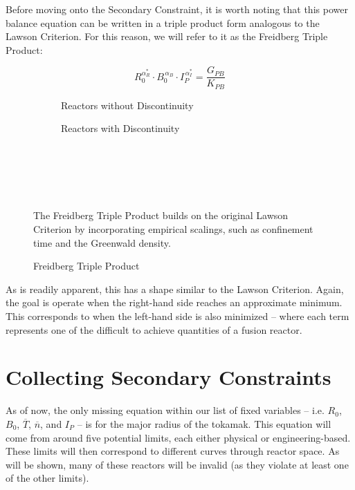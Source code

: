 Before moving onto the Secondary Constraint, it is worth noting that this power balance equation can be written in a triple product form analogous to the Lawson Criterion. For this reason, we will refer to it as the Freidberg Triple Product:

\begin{equation}
	\label{eq:freidberg}
	R_0^{ \alpha_R^* } \cdot B_0^{\,\alpha_B} \cdot I_P^{\,\alpha_I^*} = \frac{ G_{PB} }{ K_{PB} }
\end{equation}

\begin{figure*}[h]
    \centering
    \hfill 
    \begin{subfigure}[t]{0.45\textwidth}
        \centering
		\begin{adjustbox}{width=\textwidth}
			\Large
			
		\end{adjustbox}
        \caption{Reactors without Discontinuity}
    \end{subfigure}
    \hfill
    \begin{subfigure}[t]{0.45\textwidth}
        \centering
		\begin{adjustbox}{width=\textwidth}
			\Large
			
		\end{adjustbox}
        \caption{Reactors with Discontinuity}
    \end{subfigure}
    \hfill \hfill ~\\ ~\\ ~\\
    \caption{Freidberg Triple Product} ~\\
    \small The Freidberg Triple Product builds on the original Lawson Criterion by incorporating empirical scalings, such as confinement time and the Greenwald density.
\end{figure*}

As is readily apparent, this has a shape similar to the Lawson Criterion. Again, the goal is operate when the right-hand side reaches an approximate minimum. This corresponds to when the left-hand side is also minimized -- where each term represents one of the difficult to achieve quantities of a fusion reactor.

\section{Collecting Secondary Constraints}

As of now, the only missing equation within our list of fixed variables -- i.e. $R_0$, $B_0$, $\overline T$, $\overline n$, and $I_P$ -- is for the major radius of the tokamak. This equation will come from around five potential limits, each either physical or engineering-based. These limits will then correspond to different curves through reactor space. As will be shown, many of these reactors will be invalid (as they violate at least one of the other limits).

